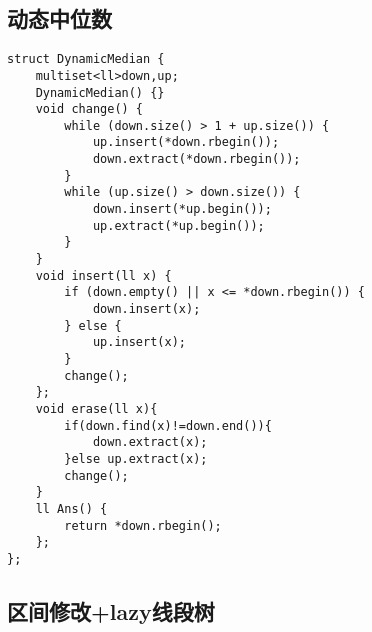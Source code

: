 \documentclass[a4paper,10pt]{article}
\begin{document}
\subsection{动态中位数}
\thispagestyle{fancy}

\noindent\begin{lstlisting}
struct DynamicMedian {
    multiset<ll>down,up;
    DynamicMedian() {}
    void change() {
        while (down.size() > 1 + up.size()) {
            up.insert(*down.rbegin());
            down.extract(*down.rbegin());
        }
        while (up.size() > down.size()) {
            down.insert(*up.begin());
            up.extract(*up.begin());
        }
    }
    void insert(ll x) {
        if (down.empty() || x <= *down.rbegin()) {
            down.insert(x);
        } else {
            up.insert(x);
        }
        change();
    };
    void erase(ll x){
        if(down.find(x)!=down.end()){
            down.extract(x);
        }else up.extract(x);
        change();
    }
    ll Ans() {
        return *down.rbegin();
    };
};\end{lstlisting}

\subsection{区间修改+lazy线段树}
\thispagestyle{fancy}
\end{document}
